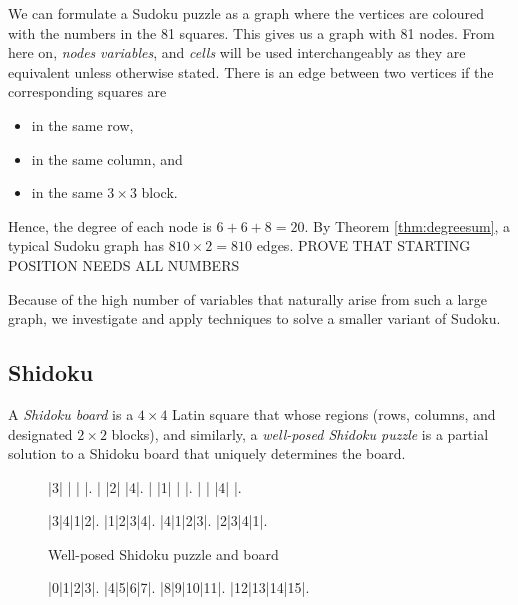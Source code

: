 \documentclass[../main.tex]{subfiles}
\begin{document}
        We can formulate a Sudoku puzzle as a graph where the vertices are coloured with the numbers in the 81 squares. This gives us a graph with 81 nodes. From here on, \emph{nodes} \emph{variables}, and \emph{cells} will be used interchangeably as they are equivalent unless otherwise stated. There is an edge between two vertices if the corresponding squares are 
        \begin{itemize}
                \item in the same row,
                \item in the same column, and 
                \item in the same $3\times 3$ block.            
            \end{itemize}
            Hence, the degree of each node is $6+6+8=20$. By Theorem \ref{thm:degreesum}, a typical Sudoku graph has $810\times 2=810$ edges. {\color{red} PROVE THAT STARTING POSITION NEEDS ALL NUMBERS}

            Because of the high number of variables that naturally arise from such a large graph, we investigate and apply techniques to solve a smaller variant of Sudoku.

            
            

            \subsection{Shidoku}

            A \emph{Shidoku board} is a $4\times 4$ Latin square that whose regions (rows, columns, and designated $2\times 2$ blocks), and similarly, a \emph{well-posed Shidoku puzzle} is a partial solution to a Shidoku board that uniquely determines the board.

            \begin{figure}[h!]
                \label{fig:shidoku}
                \centering
                \begin{shidoku-block}
                    |3| | | |.
                    | |2| |4|.
                    | |1| | |.
                    | | |4| |.
                \end{shidoku-block}
                \hspace*{10pt}
                \begin{shidoku-block}
                    |3|4|1|2|.
                    |1|2|3|4|.
                    |4|1|2|3|.
                    |2|3|4|1|.
                \end{shidoku-block}
                \caption{Well-posed Shidoku puzzle and board}
            \end{figure}
            \begin{figure}
                \centering
            \begin{shidoku-block}
                |0|1|2|3|.
                |4|5|6|7|.
                |8|9|10|11|.
                |12|13|14|15|.
            \end{shidoku-block}
        \end{figure}
            
\end{document}
